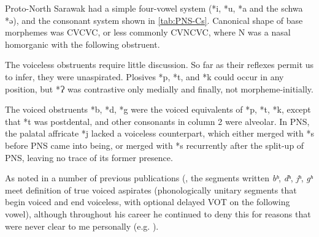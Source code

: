 \documentclass[output=paper]{langscibook}
\begin{document}
Proto-North Sarawak had a simple four-vowel system (*i, *u, *a and the schwa *ə), and the consonant system shown in \cref{tab:PNS-Cs}. %
Canonical shape of base morphemes was CVCVC, or less commonly CVNCVC, where N was a nasal homorganic with the following obstruent.

\begin{table}
\caption{\label{tab:PNS-Cs}The Proto-North Sarawak consonant system}
\end{table}

The voiceless obstruents require little discussion.  So far as their reflexes permit us to infer, they were unaspirated. Plosives *p, *t, and *k could occur in any position, but *Ɂ was contrastive only medially and finally, not morpheme-initially.

The voiced obstruents *b, *d, *g were the voiced equivalents of *p, *t, *k, except that *t was postdental, and other consonants in column 2 were alveolar.  In PNS, the palatal affricate *j lacked a voiceless counterpart, which either merged with *s before PNS came into being, or merged with *s recurrently after the split-up of PNS, leaving no trace of its former presence.

As noted in a number of previous publications (\citealt{Blust1969,Blust1974,Blust1993,Blust2005,Blust2006,Blust2016}, the segments written \textit{bʰ}, \textit{dʰ}, \textit{jʰ}, \textit{gʰ} meet  definition of true voiced aspirates (phonologically unitary segments that begin voiced and end voiceless, with optional delayed VOT on the following vowel), although throughout his career he continued to deny this for reasons that were never clear to me personally (e.g. \citealt[80]{LadefogedMaddieson1996}).
\end{document}
